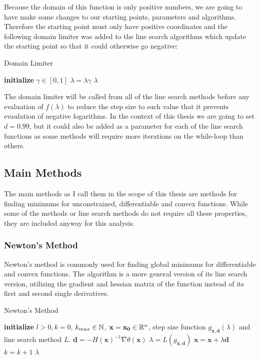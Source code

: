 \documentclass[a4paper,english,titlepage,12pt]{article}
\newcommand{\vect}[1]{\ensuremath{\mathbf{#1}}}
\newcommand{\norm}[1]{\ensuremath\Vert #1 \Vert}
\newcommand{\R}{\ensuremath\mathbb{R}}
\newcommand{\N}{\ensuremath\mathbb{N}}
\begin{document}
Because the domain of this function is only positive numbers, we are going to have make some changes to our starting points, parameters and algorithms. Therefore the starting point must only have positive coordinates and the following domain limiter was added to the line search algorithms which update the starting point so that it could otherwise go negative:

\begin{algorithm}[H]
\caption{Domain Limiter}
\label{alg_domain_limiter}
\begin{algorithmic}[1]
\STATE \textbf{initialize} $\gamma \in [0, 1]$
\WHILE{min $(\vect{x} + \lambda \vect{d}) <= 0$}
    \STATE $\lambda = \lambda \gamma$
\ENDWHILE
\RETURN $\lambda$
\end{algorithmic}
\end{algorithm}

The domain limiter will be called from all of the line search methods before any evaluation of $f(\lambda)$ to reduce the step size to such value that it prevents evaulation of negative logarithms. In the context of this thesis we are going to set $d = 0.99$, but it could also be added as a parameter for each of the line search functions as some methods will require more iterations on the while-loop than others.


\subsection{Main Methods}


The main methods as I call them in the scope of this thesis are methods for finding minimums for unconstrained, differentiable and convex functions. While some of the methods or line search methods do not require all these properties, they are included anyway for this analysis.


\subsubsection{Newton's Method}


Newton's method is  commonly used for finding global minimums for differentiable and convex functions. The algorithm is a more general version of its line search version, utilizing the gradient and hessian matrix of the function instead of its first and second single derivatives.

\begin{algorithm}[H]
\caption{Newton's Method}
\label{alg_newtons}
\begin{algorithmic}[1]
\STATE \textbf{initialize} $l > 0, k = 0$, $k_{max} \in \N$, $\vect{x} = \vect{x_0} \in \R^n$, step size function $g_{\vect{x}, \vect{d}}(\lambda)$ and line search method $L$.
\WHILE{$\norm{\nabla \theta(\vect{x})} > l$ \AND $k < k_{max}$}
    \STATE $\vect{d} = -H(\vect{x})^{-1} \nabla \theta(\vect{x})$
    \STATE $\lambda = L(g_{\vect{x}, \vect{d}})$
    \STATE $\vect{x} = \vect{x} + \lambda \vect{d}$
    \STATE $k = k + 1$
\ENDWHILE
\RETURN $\lambda$
\end{algorithmic}
\end{algorithm}
\end{document}

